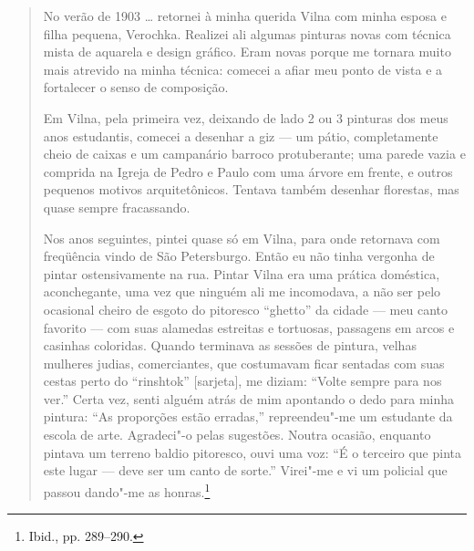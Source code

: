 \begin{quote}
No verão de 1903 \ldots{} retornei à minha querida Vilna com minha
esposa e filha pequena, Verochka. Realizei ali algumas pinturas novas
com técnica mista de aquarela e design gráfico. Eram novas porque me
tornara muito mais atrevido na minha técnica: comecei a afiar meu ponto
de vista e a fortalecer o senso de composição.

Em Vilna, pela primeira vez, deixando de lado 2 ou 3 pinturas dos meus
anos estudantis, comecei a desenhar a giz --- um pátio, completamente
cheio de caixas e um campanário barroco protuberante; uma parede vazia e
comprida na Igreja de Pedro e Paulo com uma árvore em frente, e outros
pequenos motivos arquitetônicos. Tentava também desenhar florestas, mas
quase sempre fracassando.

Nos anos seguintes, pintei quase só em Vilna, para onde retornava com
freqüência vindo de São Petersburgo. Então eu não tinha vergonha de
pintar ostensivamente na rua. Pintar Vilna era uma prática doméstica,
aconchegante, uma vez que ninguém ali me incomodava, a não ser pelo
ocasional cheiro de esgoto do pitoresco ``ghetto'' da cidade --- meu canto
favorito --- com suas alamedas estreitas e tortuosas, passagens em arcos e
casinhas coloridas. Quando terminava as sessões de pintura, velhas
mulheres judias, comerciantes, que costumavam ficar sentadas com suas
cestas perto do ``rinshtok'' {[}sarjeta{]}, me diziam: ``Volte sempre
para nos ver.'' Certa vez, senti alguém atrás de mim apontando o dedo
para minha pintura: ``As proporções estão erradas,'' repreendeu"-me um
estudante da escola de arte. Agradeci"-o pelas sugestões. Noutra ocasião,
enquanto pintava um terreno baldio pitoresco, ouvi uma voz: ``É o
terceiro que pinta este lugar --- deve ser um canto de sorte.'' Virei"-me e
vi um policial que passou dando"-me as honras.\footnote{Ibid., pp.
  289--290.}
\end{quote}

